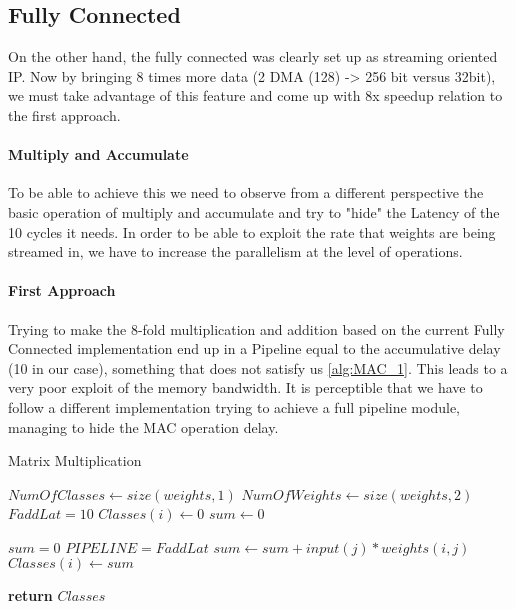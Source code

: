\subsection {Fully Connected}

On the other hand, the fully connected was clearly set up as streaming oriented IP. Now by bringing 8 times more data (2 DMA (128) -> 256 bit versus 32bit), we must take advantage of this feature and come up with  8x speedup relation to the first approach.

\paragraph {Multiply and Accumulate}
To be able to achieve this we need to observe from a different perspective the basic operation of multiply and accumulate and try to "hide" the Latency of the 10 cycles it needs. In order to be able to exploit the rate that weights are being streamed in, we have to increase the parallelism at the level of operations.

\paragraph{First Approach} Trying to make the 8-fold multiplication and addition based on the current Fully Connected implementation end up in a Pipeline equal to the accumulative delay (10 in our case), something that does not satisfy us \ref{alg:MAC_1}. This leads to a very poor exploit of the memory bandwidth. It is perceptible that we have to follow a different implementation trying to achieve a full pipeline module, managing to hide the MAC operation delay.


\begin{algorithm}[h]
\caption{Matrix Multiplication}\label{alg:MAC_1}
\begin{algorithmic}[1]
\State $NumOfClasses \gets size(weights,1)$ 
\State $NumOfWeights \gets size(weights,2)$ 
 \State $FaddLat=10$ 
\State $Classes(i)\gets 0$
\EndFor 
 \State $sum\gets 0$


\State $sum=0$
\State $ PIPELINE=FaddLat$
\State $sum \gets sum + input(j)*weights(i,j)$
\EndFor 
\State $Classes(i)\gets sum$
\EndFor 

\State \textbf{return} $Classes$       
\EndProcedure
\end{algorithmic}
\end{algorithm}

